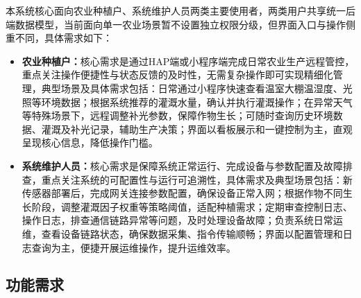 \documentclass{article}
\begin{document}
本系统核心面向农业种植户、系统维护人员两类主要使用者，两类用户共享统一后端数据模型，当前面向单一农业场景暂不设置独立权限分级，但界面入口与操作侧重不同，具体需求如下：
\begin{itemize}[leftmargin=2em,itemsep=0.2em,topsep=0.2em]

    \item \textbf{农业种植户：}核心需求是通过HAP端或小程序端完成日常农业生产远程管控，重点关注操作便捷性与状态反馈的及时性，无需复杂操作即可实现精细化管理，典型场景及具体需求包括：日常通过小程序快速查看温室大棚温湿度、光照等环境数据；根据系统推荐的灌溉水量，确认并执行灌溉操作；在异常天气等特殊场景下，远程调整补光参数，保障作物生长；可随时查询历史环境数据、灌溉及补光记录，辅助生产决策；界面以看板展示和一键控制为主，直观呈现核心信息，降低操作门槛。

    \item \textbf{系统维护人员：}核心需求是保障系统正常运行、完成设备与参数配置及故障排查，重点关注系统的可配置性与运行可追溯性，具体需求及典型场景包括：新传感器部署后，完成网关连接参数配置，确保设备正常入网；根据作物不同生长阶段，调整灌溉因子权重等策略阈值，适配种植需求；定期审查控制日志、操作日志，排查通信链路异常等问题，及时处理设备故障；负责系统日常运维，查看设备链路状态，确保数据采集、指令传输顺畅；界面以配置管理和日志查询为主，便捷开展运维操作，提升运维效率。

\end{itemize}

\subsection{功能需求}
\end{document}

